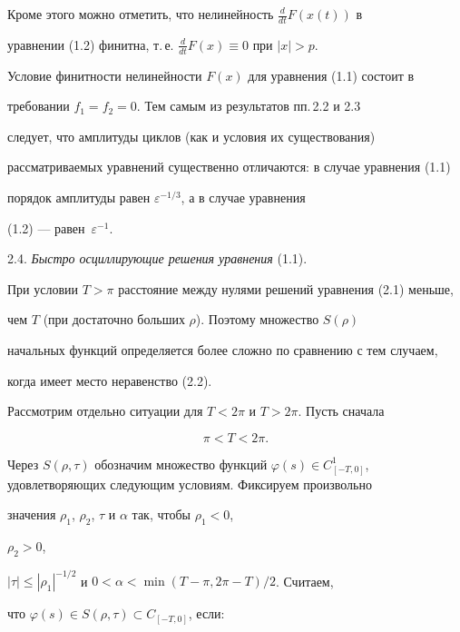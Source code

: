 Кроме этого можно отметить, что нелинейность $\frac {d}{dt}F(x(t))$ в


уравнении (1.2) финитна, т.\,е. $\frac {d}{dt}F(x)\equiv0$ при $|x|>p$.


Условие финитности нелинейности $F(x)$ для уравнения (1.1) состоит в


требовании $f_1 = f_2 = 0$. Тем самым из результатов пп.\,2.2 и 2.3


следует, что амплитуды циклов (как и условия их существования)


рассматриваемых уравнений существенно отличаются: в случае уравнения (1.1)


порядок амплитуды равен $\varepsilon^{-1/3}$, а в случае уравнения


(1.2) --- равен~$\varepsilon^{-1}$.


\medskip





2.4. {\it Быстро осциллирующие решения уравнения} (1.1).


При условии $T>\pi$ расстояние между нулями решений уравнения (2.1) меньше,


чем $T$ (при достаточно больших $\rho$). Поэтому множество $S(\rho)$


начальных функций определяется более сложно по сравнению с тем случаем,


когда имеет место неравенство (2.2).





Рассмотрим отдельно ситуации для $T<2\pi$ и $T>2\pi$. Пусть сначала


\begin{equation}


\pi < T < 2\pi.


\end{equation}


Через $S(\rho,\tau)$ обозначим множество функций $\varphi(s)\in


C^1_{[-T,0]}$, удовлетворяющих следующим условиям. Фиксируем произвольно


значения $\rho_1$, $\rho_2$, $\tau$ и $\alpha$ так, чтобы $\rho_1<0$,


$\rho_2>0$,


$|\tau|\le|\rho_1|^{-1/2}$ и $0<\alpha< \min(T-\pi,2\pi-T)/2$. Считаем,


что $\varphi(s)\in S(\rho,\tau)\subset C_{[-T,0]}$, если:


